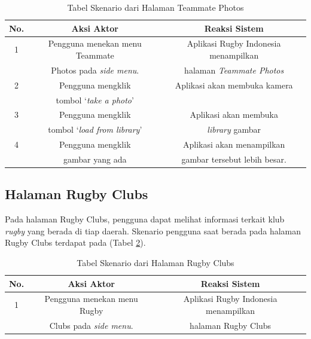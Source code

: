 \begin{table} [!h]
    \centering
    \caption{Tabel Skenario dari Halaman Teammate Photos}
    \begin{tabular}{|c|c|c|}
    \hline
       No. & Aksi Aktor & Reaksi Sistem  \\ \hline
        1 & Pengguna menekan menu Teammate & Aplikasi Rugby Indonesia menampilkan \\
         &  Photos pada \textit{side menu}. & halaman \textit{Teammate Photos} \\ \hline
        2 & Pengguna mengklik & Aplikasi akan membuka kamera \\ 
         & tombol `\textit{take a photo}' &  \\ \hline
        3 & Pengguna mengklik & Aplikasi akan membuka  \\ 
         & tombol `\textit{load from library}' & \textit{library} gambar  \\ \hline
        4 & Pengguna mengklik & Aplikasi akan menampilkan \\
          & gambar yang ada & gambar tersebut lebih besar. \\ \hline
    \end{tabular}
    \label{tab:existing-scenario-teammate-photos-page}
\end{table}

\subsection{Halaman Rugby Clubs}
Pada halaman Rugby Clubs, pengguna dapat melihat informasi terkait klub \textit{rugby} yang berada di tiap daerah. Skenario pengguna saat berada pada halaman Rugby Clubs terdapat pada (Tabel \ref{tab:existing-scenario-rugby-clubs-page}).

\begin{table} [H]
    \centering
    \caption{Tabel Skenario dari Halaman Rugby Clubs}
    \begin{tabular}{|c|c|c|}
    \hline
       No. & Aksi Aktor & Reaksi Sistem  \\ \hline
        1 & Pengguna menekan menu Rugby & Aplikasi Rugby Indonesia menampilkan \\
         &  Clubs pada \textit{side menu}. & halaman Rugby Clubs \\ \hline
    \end{tabular}
    \label{tab:existing-scenario-rugby-clubs-page}
\end{table}

